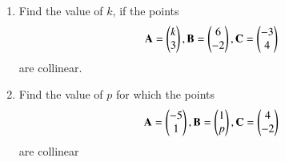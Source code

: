 \renewcommand{\theequation}{\theenumi}
\begin{enumerate}[label=\thesection.\arabic*.,ref=\thesection.\theenumi]

\item Find the value of $k$, if the points
\begin{align}
\mathbf {A}=\begin{pmatrix}k\\3\end{pmatrix},
\mathbf {B}=\begin{pmatrix}6\\-2\end{pmatrix},
\mathbf {C}=\begin{pmatrix}-3\\4\end{pmatrix}
\end{align}
are collinear.
\\
\solution

%
\item Find the value of $p$ for which the points
\begin{align}
\mathbf {A}=\begin{pmatrix}-5\\1\end{pmatrix},
\mathbf {B}=\begin{pmatrix}1\\p\end{pmatrix},
\mathbf {C}=\begin{pmatrix}4\\-2\end{pmatrix}
\end{align}
are collinear
\\
\solution


\end{enumerate}